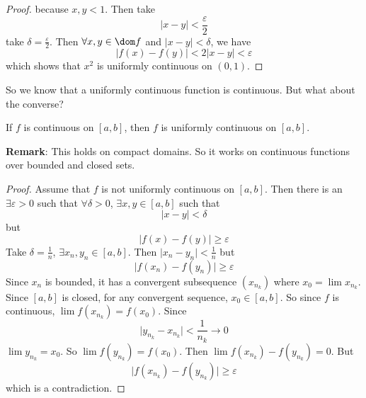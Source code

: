 \documentclass{report}
\begin{document}
\begin{examples}
\begin{example}
\begin{proof}
                because $x, y < 1$. Then take 
                    \begin{equation*}
                        \lvert x - y \rvert < \dfrac{\varepsilon}{ 2}
                    \end{equation*}
                take $\delta =\frac{\varepsilon}{ 2}$. Then $\forall x, y \in \dom f$ and $\lvert x - y \rvert< \delta$, we have
                    \begin{equation*}
                        \lvert f(x) - f(y) \rvert< 2\lvert x - y \rvert < \varepsilon
                    \end{equation*}
                which shows that $x^{2}$ is uniformly continuous on $(0, 1)$.
            \end{proof}
    \end{example}
\end{examples}

So we know that a uniformly continuous function is continuous. But what about the converse?

\begin{theorem}{19.2}
    If $f$ is continuous on $[a, b]$, then $f$ is uniformly continuous on $[a, b]$.
\end{theorem}

\textbf{Remark}: This holds on compact domains. So it works on continuous functions over bounded and closed sets.
    \begin{proof}
        Assume that $f$ is not uniformly continuous on $[a, b]$. Then there is an $\exists \varepsilon> 0$ such that $\forall \delta> 0$, $\exists x, y \in [a, b]$ such that
            \begin{equation*}
                \lvert x - y \rvert < \delta
            \end{equation*}
        but
            \begin{equation*}
                \lvert f(x) - f(y) \rvert \geq \varepsilon
            \end{equation*}
        Take $\delta = \frac{1}{n}$, $\exists x_{n}, y_{n} \in [a, b]$. Then $\lvert x_{n} - y_{n} \rvert<\frac{1}{n}$ but 
            \begin{equation*}
                \lvert f(x_{n}) - f(y_{n}) \rvert \geq \varepsilon
            \end{equation*}
        Since $x_{n}$ is bounded, it has a convergent subsequence $(x_{n_{k}})$ where $x_{0} = \lim x_{n_{k}}$. Since $[a, b]$ is closed, for any convergent sequence, $x_{0} \in [a, b]$. So since $f$ is continuous, $\lim f(x_{n_{k}}) = f(x_{0})$. Since
            \begin{equation*}
                \lvert y_{n_{k}} - x_{n_{k}} \rvert<\dfrac{1}{n_{k}} \rightarrow 0
            \end{equation*}
        $\lim y_{n_{k}} = x_{0}$. So $\lim f(y_{n_{k}}) = f(x_{0})$. Then $\lim f(x_{n_{k}}) - f(y_{n_{k}}) = 0$. But 
            \begin{equation*}
                \lvert f(x_{n_{k}}) - f(y_{n_{k}}) \rvert \geq \varepsilon
            \end{equation*}
        which is a contradiction.
    \end{proof}
\end{document}
